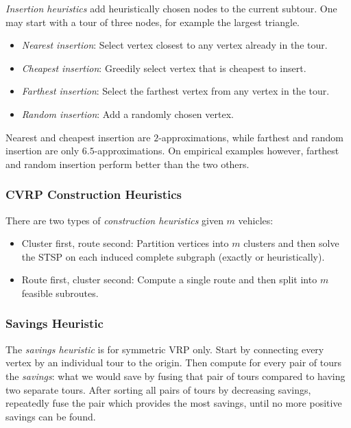 \documentclass[english]{panikzettel}
\begin{document}
\emph{Insertion heuristics} add heuristically chosen nodes to the current subtour.
One may start with a tour of three nodes, for example the largest triangle.
\begin{itemize}
    \item \emph{Nearest insertion}: Select vertex closest to any vertex already in the tour.
    \item \emph{Cheapest insertion}: Greedily select vertex that is cheapest to insert.
    \item \emph{Farthest insertion}: Select the farthest vertex from any vertex in the tour.
    \item \emph{Random insertion}: Add a randomly chosen vertex.
\end{itemize}
Nearest and cheapest insertion are $2$-approximations, while farthest and random insertion are only $6.5$-approximations.
On empirical examples however, farthest and random insertion perform better than the two others.

\pagebreak
\subsubsection{CVRP Construction Heuristics}

There are two types of \emph{construction heuristics} given $m$ vehicles:
\begin{itemize}
    \item Cluster first, route second: Partition vertices into $m$ clusters and then solve the STSP on each induced complete subgraph (exactly or heuristically).
    \item Route first, cluster second: Compute a single route and then split into $m$ feasible subroutes.
\end{itemize}

\subsubsection{Savings Heuristic}

The \emph{savings heuristic} is for symmetric VRP only.
Start by connecting every vertex by an individual tour to the origin.
Then compute for every pair of tours the \emph{savings}: what we would save by fusing that pair of tours compared to having two separate tours.
After sorting all pairs of tours by decreasing savings, repeatedly fuse the pair which provides the most savings, until no more positive savings can be found.
\end{document}
